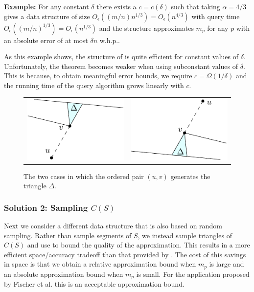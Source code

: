 \documentclass{patmorin}
\newcommand{\Oe}{O_\epsilon}
\begin{document}
\noindent\textbf{Example:} For any constant $\delta$ there exists
a $c=c(\delta)$ such that taking $\alpha = 4/3$ gives a data
structure of size $\Oe((m/n)n^{1/3})=\Oe(n^{4/3})$ with query time
$\Oe((m/n)^{1/3})=\Oe(n^{1/3})$ and the structure approximates $m_p$
for any $p$ with an absolute error of at most $\delta n$ w.h.p..

As this example shows, the structure of  is quite
efficient for constant values of $\delta$. Unfortunately, the theorem
becomes weaker when using subconstant values of $\delta$.
This is because, to obtain meaningful error bounds, we require
$c=\Omega(1/\delta)$ and the running time of the query algorithm grows
linearly with $c$.

\begin{figure}
  \begin{center}
    \begin{tabular}{cc}
      \includegraphics{uv-sample-a} &
      \includegraphics{uv-sample-b} \\
    \end{tabular}
  \end{center}
  \caption{The two cases in which the ordered pair $(u,v)$ generates the
           triangle $\Delta$.}
\end{figure}

\subsubsection{Solution 2: Sampling $C(S)$}

Next we consider a different data structure that is also based on
random sampling. Rather than sample segments of $S$, we instead sample
triangles of $C(S)$ and use  to bound the quality of the
approximation.  This results in a more efficient space/accuracy tradeoff
than that provided by .  The cost of this savings
in space is that we obtain a relative approximation bound when $m_p$
is large and an absolute approximation bound when $m_p$ is small. For
the application proposed by Fischer et al. \cite{fhjmz08,fhjmz09} this
is an acceptable approximation bound.
\end{document}
